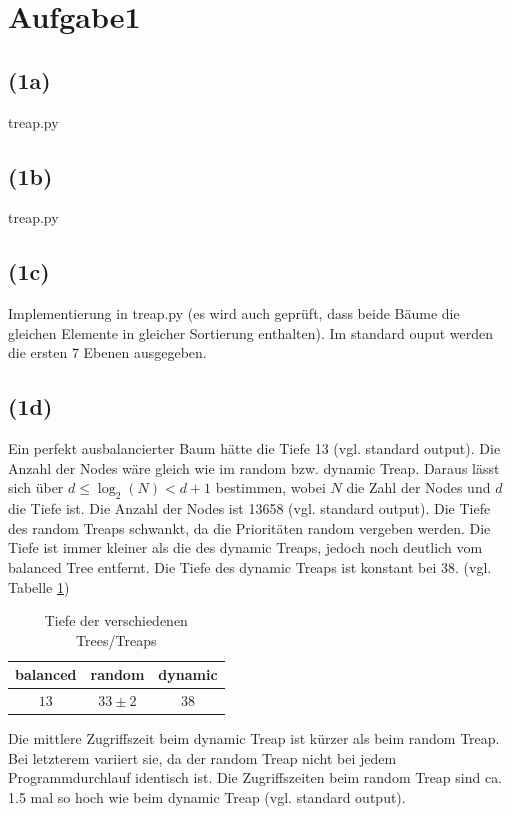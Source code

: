 \documentclass[a4paper]{article}
\begin{document}

\section*{Aufgabe1}
\subsection*{(1a)}
treap.py
\subsection*{(1b)}
treap.py
\subsection*{(1c)}
Implementierung in treap.py (es wird auch geprüft, dass beide Bäume die gleichen Elemente in gleicher Sortierung enthalten). Im standard ouput werden die ersten 7 Ebenen ausgegeben.
\subsection*{(1d)}
Ein perfekt ausbalancierter Baum hätte die Tiefe 13 (vgl. standard output). Die Anzahl der Nodes wäre gleich wie im random bzw. dynamic Treap. Daraus lässt sich über $d \le \log_2(N) < d+1$ bestimmen, wobei $N$ die Zahl der Nodes und $d$ die Tiefe ist. Die Anzahl der Nodes ist 13658 (vgl. standard output). Die Tiefe des random Treaps schwankt, da die Prioritäten random vergeben werden. Die Tiefe ist immer kleiner als die des dynamic Treaps, jedoch noch deutlich vom balanced Tree entfernt. Die Tiefe des dynamic Treaps ist konstant bei 38. (vgl. Tabelle \ref{tab:depth})
\begin{table}[H]
\centering
\begin{tabular}{|c|c|c|}
\hline
balanced & random & dynamic \\\hline
$13$ & $33\pm2$ & $38$ \\\hline
\end{tabular}
\caption{Tiefe der verschiedenen Trees/Treaps}
\label{tab:depth}
\end{table}

Die mittlere Zugriffszeit beim dynamic Treap ist kürzer als beim random Treap. Bei letzterem variiert sie, da der random Treap nicht bei jedem Programmdurchlauf identisch ist. Die Zugriffszeiten beim random Treap sind ca. 1.5 mal so hoch wie beim dynamic Treap (vgl. standard output).
\end{document}

